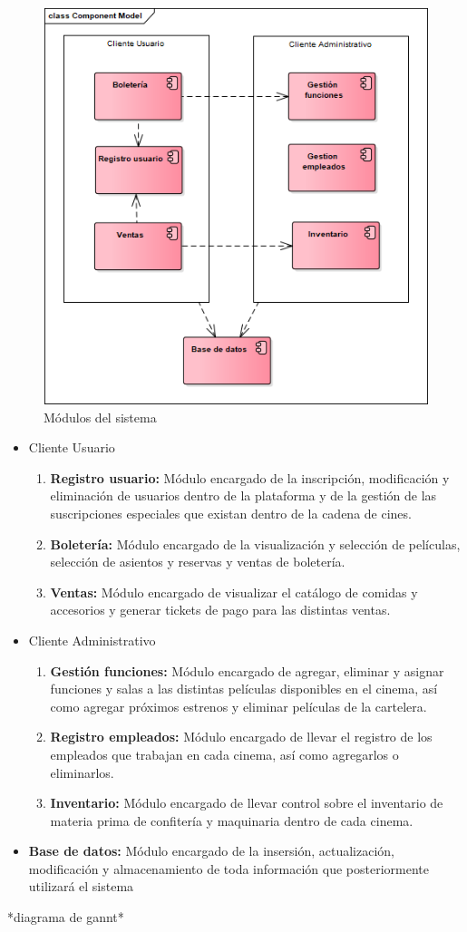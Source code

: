 \begin{figure}[h!]
	\centering
\includegraphics[width=0.7\linewidth]{proyecto/proceso/imgs/modulos}
	\caption{Módulos del sistema}
\end{figure}


\begin{itemize}
	\item{Cliente Usuario}
		\begin{enumerate}
			\item{\textbf{Registro usuario:} Módulo encargado de la inscripción, modificación y eliminación de usuarios dentro de la plataforma y de la gestión de las suscripciones especiales que existan dentro de la cadena de cines.}
			\item{\textbf{Boletería:} Módulo encargado de la visualización y selección de películas, selección de asientos y reservas y ventas de boletería.}
			\item{\textbf{Ventas:} Módulo encargado de visualizar el catálogo de comidas y accesorios y generar tickets de pago para las distintas ventas.}
		\end{enumerate}
	\item{Cliente Administrativo}
		\begin{enumerate}
			\item{\textbf{Gestión funciones:} Módulo encargado de agregar, eliminar y asignar funciones y salas a las distintas películas disponibles en el cinema, así como agregar próximos estrenos y eliminar películas de la cartelera.}
			\item{\textbf{Registro empleados:} Módulo encargado de llevar el registro de los empleados que trabajan en cada cinema, así como agregarlos o eliminarlos.}
			\item{\textbf{Inventario:} Módulo encargado de llevar control sobre el inventario de materia prima de confitería y maquinaria dentro de cada cinema.}
		\end{enumerate}
	\item{\textbf{Base de datos:} Módulo encargado de la insersión, actualización, modificación y almacenamiento de toda información que posteriormente utilizará el sistema}
\end{itemize}

*diagrama de gannt*